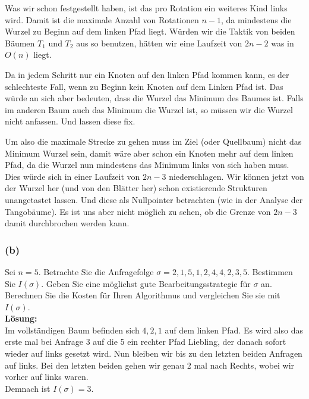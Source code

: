 \documentclass[11pt,a4paper,ngerman]{article}
\begin{document}
Was wir schon festgestellt haben, ist das pro Rotation ein weiteres Kind links wird. Damit ist die maximale Anzahl von Rotationen $n-1$, da mindestens die Wurzel zu Beginn auf dem linken Pfad liegt. Würden wir die Taktik von beiden Bäumen $T_1$ und $T_2$ aus so benutzen, hätten wir eine Laufzeit von $2n-2$ was in $O(n)$ liegt.

Da in jedem Schritt nur ein Knoten auf den linken Pfad kommen kann, es der schlechteste Fall, wenn zu Beginn kein Knoten auf dem Linken Pfad ist. Das würde an sich aber
bedeuten, dass die Wurzel das Minimum des Baumes ist. Falls im anderen Baum auch das Minimum die Wurzel ist, so müssen wir die Wurzel nicht anfassen. Und lassen diese fix.

Um also die maximale Strecke zu gehen muss im Ziel (oder Quellbaum) nicht das Minimum Wurzel sein, damit wäre aber schon ein Knoten mehr auf dem linken Pfad,
da die Wurzel nun mindestens das Minimum links von sich haben muss.\\

Dies würde sich in einer Laufzeit von $2n-3$ niederschlagen. Wir können jetzt von der Wurzel her (und von den Blätter her) schon existierende Strukturen unangetastet lassen. Und diese als Nullpointer betrachten (wie in der Analyse der Tangobäume). Es ist uns aber nicht möglich zu sehen, ob die Grenze von $2n-3$ damit durchbrochen werden kann.

\subsubsection*{(b)}

Sei $n=5$. Betrachte Sie die Anfragefolge $\sigma = 2,1,5,1,2,4,4,2,3,5$. Bestimmen Sie $I(\sigma)$. Geben Sie eine möglichst gute Bearbeitungsstrategie für $\sigma$ an. Berechnen Sie die Kosten für Ihren Algorithmus und vergleichen Sie sie mit $I(\sigma)$.\\

\noindent\textbf{Lösung:}\\

Im vollständigen Baum befinden sich $4,2,1$ auf dem linken Pfad. Es wird also das erste mal bei Anfrage $3$ auf die 5 ein rechter Pfad Liebling, der danach sofort wieder auf links gesetzt wird. Nun bleiben wir bis zu den letzten beiden Anfragen auf links. Bei den letzten beiden gehen wir genau 2 mal nach Rechts, wobei wir vorher auf links waren.\\

Demnach ist $I(\sigma) = 3$.\\
\end{document}
